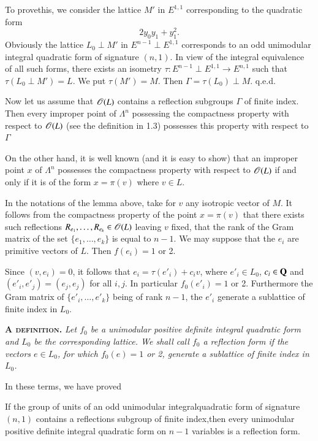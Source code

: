 To prove\pageoriginale this, we consider the lattice $M'$ in $E^{1,1}$ corresponding to the quadratic form
\begin{equation}
2 y_0 y_1 + y^2_1. \label{art10-eq3.2} 
\end{equation}
Obviously the lattice $L_0 \perp M'$ in $E^{n-1} \perp E^{1,1}$ corresponds to an odd unimodular integral quadratic form of signature $(n,1)$. In view of the integral equivalence of all such forms, there exists an isometry $\tau : E^{n-1} \perp E^{1,1} \to E^{n,1}$ such that $\tau (L_0 \perp M') = L$. We put $\tau (M') = M$. Then $\Gamma = \tau (L_0) \perp M$. q.e.d.

Now let us assume that $\mathscr{O} (L)$ contains a reflection subgroups $\Gamma$ of finite index. Then every improper point of $\Lambda^n$ possessing the compactness property with respect to $\mathscr{O} (L)$ (see the definition in 1.3) possesses this property with respect to $\Gamma$

On the other hand, it is well known (and it is easy to show) that an improper point $x$ of $\Lambda^n$ possesses the compactness property with respect to $\mathscr{O} (L)$ if  and only if it is of the  form $x = \pi (v)$ where $v \in L$.

In the notations of the lemma above, take for $v$ any isotropic vector of $M$. It follows from the compactness property of the point $x = \pi (v)$ that there exists such reflections $R_{e_1},\ldots, R_{e_k} \in \mathscr{O}(L)$ leaving $v$ fixed, that the rank of the Gram matrix of the set $\{e_1, \ldots , e_k\}$ is equal to $n-1$. We may suppose that the $e_i$ are primitive vectors of $L$. Then $f(e_i) = 1$ or 2.

Since $(v, e_i) = 0$, it follows that $e_i = \tau (e'_i) + c_i v$, where $e'_i \in L_0$, $c_i \in\mathbf{Q}$ and $(e'_i, e'_j) = (e_j, e_j)$ for all $i, j$. In particular $f_0 (e'_i) =1$ or 2. Furthermore  the Gram matrix of $\{e'_i, \ldots , e'_k\}$ being of rank $n -1$, the $e'_i$ generate a sublattice of finite index in $L_0$. 

\medskip
\noindent
\textbf{\textsc{A definition.}} \textit{Let $f_0$ be a unimodular positive definite integral quadratic form and $L_0$ be the corresponding lattice. We shall call $f_0$ a reflection form if the vectors $e \in L_0$, for which $f_0(e) =1$ or 2, generate a sublattice of finite index in $L_0$.}

In these terms, we have proved

\setcounter{theorem}{4}
\begin{theorem}\label{art10-thm3.5}
If the group of units of an odd unimodular integral\break quadratic form of signature $(n,1)$ contains a reflections subgroup of finite index,\pageoriginale then every unimodular positive definite integral quadratic form on $n-1$ variables is a reflection form.
\end{theorem}


